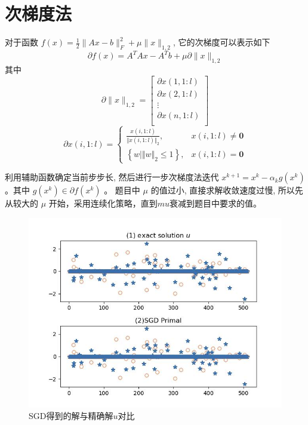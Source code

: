 \documentclass[12pt]{article}
\begin{document}
	\section{次梯度法}

	对于函数 $f(x)=\frac{1}{2}\|A x-b\|_F^2+\mu\|x\|_{1,2}$, 它的次梯度可以表示如下
	$$
	\partial f(x)=A^T A x-A^T b+\mu  \partial \|x\|_{1,2}
	$$
	其中\begin{equation*}
		\partial \|x\|_{1,2} = \left[\begin{array}{c}
		 \partial x(1,1:l)\\
			\partial x(2,1:l)\\
			\vdots\\
		\partial x(n,1:l)\\
		\end{array} \right]
	\end{equation*}
\begin{equation*}
	\partial x(i,1:l) = 	\left\{
	\begin{array}{ll}
		\frac{x(i,1:l)}{\Vert x(i,1:l) \Vert_2}, &   x(i,1:l)\neq \mathbf{0}\\
		\left\{w \mid\Vert w \Vert_2  \leq 1 \right\}, & x(i,1:l) = \mathbf{0}
	\end{array}
	\right.
\end{equation*}

利用辅助函数确定当前步步长, 然后进行一步次梯度法迭代 $x^{k+1}=x^k-\alpha_k g\left(x^k\right)$ 。其中 $g\left(x^k\right) \in \partial f\left(x^k\right)$ 。
	题目中 $\mu$ 的值过小, 直接求解收敛速度过慢, 所以先从较大的 $\mu$ 开始，采用连续化策略，直到$mu$衰减到题目中要求的值。
	\begin{figure}[H]
	\centering
	\includegraphics[width=\textwidth]{figs/SGD Primal.jpg}
	\caption{SGD得到的解与精确解$u$对比}
\end{figure}
	
\end{document}
